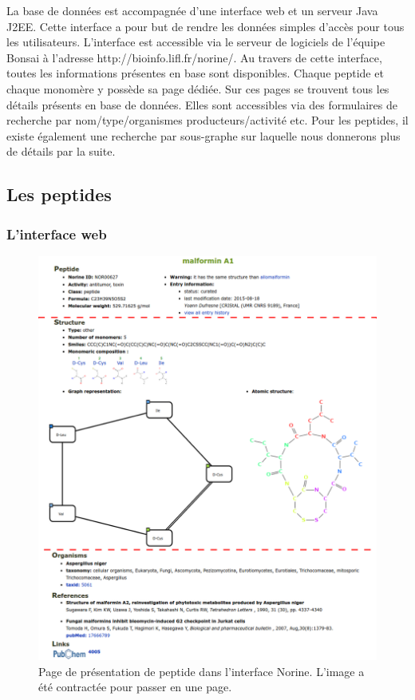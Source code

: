 La base de données est accompagnée d'une interface web et un serveur Java J2EE.
Cette interface a pour but de rendre les données simples d'accès pour tous les utilisateurs.
L'interface est accessible via le serveur de logiciels de l'équipe Bonsai à l'adresse http://bioinfo.lifl.fr/norine/.
Au travers de cette interface, toutes les informations présentes en base sont disponibles.
Chaque peptide et chaque monomère y possède sa page dédiée.
Sur ces pages se trouvent tous les détails présents en base de données.
Elles sont accessibles via des formulaires de recherche par nom/type/organismes producteurs/activité etc.
Pour les peptides, il existe également une recherche par sous-graphe sur laquelle nous donnerons plus de détails par la suite.



\subsection{Les peptides}

\subsubsection{L'interface web}

\begin{figure}[h!]
  \begin{center}
    \includegraphics[width=450px]{Figures/Norine/malformin_nor.png}
    \caption{\label{interface}Page de présentation de peptide dans l'interface Norine.
    L'image a été contractée pour passer en une page.}
  \end{center}
\end{figure}

